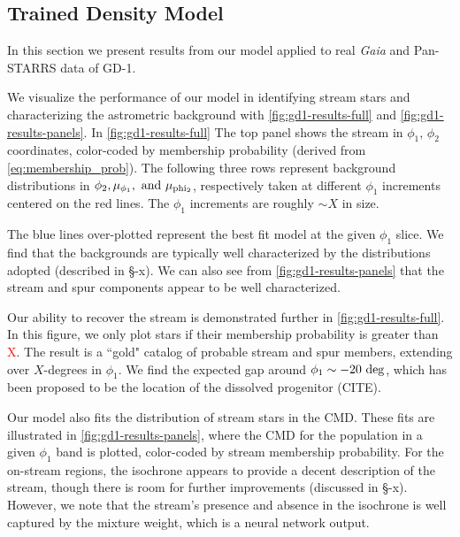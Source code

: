 \documentclass[twocolumn]{aastex631}
\newcommand{\TODO}[1]{{\textcolor{red}{#1}}}
\newcommand{\JN}[1]{\TODO{#1}}
\begin{document}
    \subsection{Trained Density Model}\label{sub:results_gd1:results}
    
        In this section we present results from our model applied to real {\it
        Gaia} and Pan-STARRS data of GD-1. 

        We visualize the performance of our model in identifying stream stars
        and characterizing the astrometric background with
        \autoref{fig:gd1-results-full} and \autoref{fig:gd1-results-panels}. In
        \autoref{fig:gd1-results-full} The top panel shows the stream in
        $\phi_1$, $\phi_2$ coordinates, color-coded by membership probability
        (derived from \autoref{eq:membership_prob}). The following three rows
        represent background distributions in $\phi_2, \mu_{\phi_1}, \rm{\ and}
        \ \mu_{\rm phi_2}$, respectively taken at different $\phi_1$ increments
        centered on the red lines. The $\phi_1$ increments are roughly $\sim X$
        in size.

        The blue lines over-plotted represent the best fit model at the given
        $\phi_1$ slice. We find that the backgrounds are typically well
        characterized by the distributions adopted (described in \S-x). We can
        also see from \autoref{fig:gd1-results-panels} that the stream and spur
        components appear to be well characterized. 
        
        Our ability to recover the stream is demonstrated further in
        \autoref{fig:gd1-results-full}. In this figure, we only plot stars if
        their membership probability is greater than \JN{X}. The result is a
        ``gold" catalog of probable stream and spur members, extending over
        $X$-degrees in $\phi_1$. We find the expected gap around $\phi_1 \sim
        -20~\rm{deg}$, which has been proposed to be the location of the
        dissolved progenitor (CITE).

        Our model also fits the distribution of stream stars in the CMD. These
        fits are illustrated in \autoref{fig:gd1-results-panels}, where the CMD
        for the population in a given $\phi_1$ band is plotted, color-coded by
        stream membership probability. For the on-stream regions, the isochrone
        appears to provide a decent description of the stream, though there is
        room for further improvements (discussed in \S-x). However, we note that
        the stream's presence and absence in the isochrone is well captured by
        the mixture weight, which is a neural network output. 
        
\end{document}
